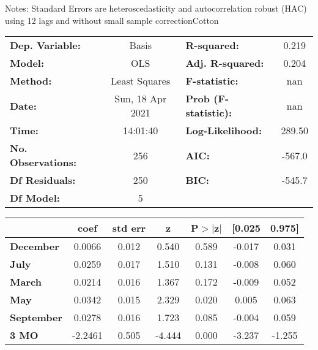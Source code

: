 Notes: \newline
 [1] Standard Errors are heteroscedasticity and autocorrelation robust (HAC) using 12 lags and without small sample correctionCotton\begin{center}
\begin{tabular}{lclc}
\toprule
\textbf{Dep. Variable:}    &      Basis       & \textbf{  R-squared:         } &     0.219   \\
\textbf{Model:}            &       OLS        & \textbf{  Adj. R-squared:    } &     0.204   \\
\textbf{Method:}           &  Least Squares   & \textbf{  F-statistic:       } &       nan   \\
\textbf{Date:}             & Sun, 18 Apr 2021 & \textbf{  Prob (F-statistic):} &      nan    \\
\textbf{Time:}             &     14:01:40     & \textbf{  Log-Likelihood:    } &    289.50   \\
\textbf{No. Observations:} &         256      & \textbf{  AIC:               } &    -567.0   \\
\textbf{Df Residuals:}     &         250      & \textbf{  BIC:               } &    -545.7   \\
\textbf{Df Model:}         &           5      & \textbf{                     } &             \\
\bottomrule
\end{tabular}
\begin{tabular}{lcccccc}
                   & \textbf{coef} & \textbf{std err} & \textbf{z} & \textbf{P$> |$z$|$} & \textbf{[0.025} & \textbf{0.975]}  \\
\midrule
\textbf{December}  &       0.0066  &        0.012     &     0.540  &         0.589        &       -0.017    &        0.031     \\
\textbf{July}      &       0.0259  &        0.017     &     1.510  &         0.131        &       -0.008    &        0.060     \\
\textbf{March}     &       0.0214  &        0.016     &     1.367  &         0.172        &       -0.009    &        0.052     \\
\textbf{May}       &       0.0342  &        0.015     &     2.329  &         0.020        &        0.005    &        0.063     \\
\textbf{September} &       0.0278  &        0.016     &     1.723  &         0.085        &       -0.004    &        0.059     \\
\textbf{3 MO}      &      -2.2461  &        0.505     &    -4.444  &         0.000        &       -3.237    &       -1.255     \\

\end{tabular}
\end{center}
